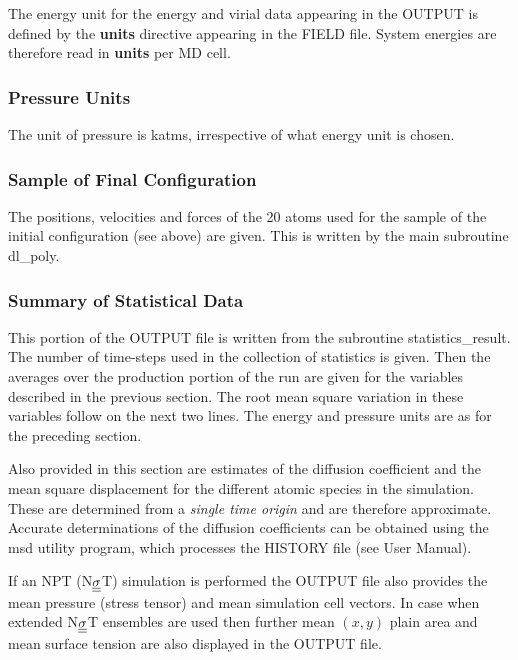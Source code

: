 The energy unit for the energy and virial data appearing in the
OUTPUT is defined by the {\bf units} directive appearing in the
FIELD file.  System energies are therefore read in {\bf units}
per MD cell.

\subsubsection*{Pressure Units}

The unit of pressure is katms, irrespective
of what energy unit is chosen.

\subsubsection{Sample of Final Configuration}

The positions, velocities and forces of the 20 atoms used for the
sample of the initial configuration (see above) are given.  This
is written by the main subroutine {\sc dl\_poly}.

\subsubsection{Summary of Statistical Data}

This portion of the OUTPUT file is written from the subroutine
{\sc statistics\_result}.  The number of time-steps used in the
collection of statistics is given.  Then the averages over the
production portion of the run are given for the variables
described in the previous section.  The root mean square variation
in these variables follow on the next two lines.  The
energy and pressure
units are as for the preceding section.

Also provided in this section are estimates of the diffusion
coefficient and the mean square displacement for the different
atomic species in the simulation.  These are determined from a {\em
single time origin} and are therefore approximate.  Accurate
determinations of the diffusion coefficients can be obtained using
the {\sc msd} utility program, which processes the HISTORY file
(see \C User Manual).

If an NPT (N$\mbox{$\underline{\underline{\bf \sigma}}$}$T) simulation is performed the OUTPUT
file also provides the mean pressure (stress tensor) and mean
simulation cell vectors.  In case when extended N$\mbox{$\underline{\underline{\bf \sigma}}$}$T
ensembles are used then further mean $(x,y)$ plain area and mean
surface tension are also displayed in the OUTPUT file.

